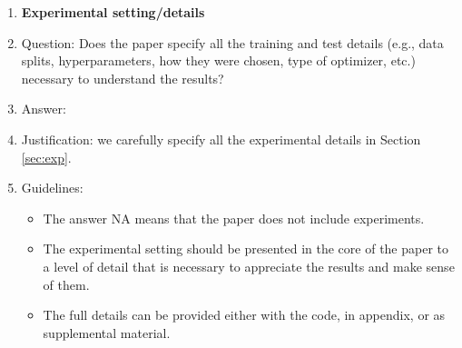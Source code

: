 \documentclass{article}
\theoremstyle{plain}
\theoremstyle{definition}
\theoremstyle{remark}
\begin{document}
\begin{enumerate}
\item {\bf Experimental setting/details}
    \item[] Question: Does the paper specify all the training and test details (e.g., data splits, hyperparameters, how they were chosen, type of optimizer, etc.) necessary to understand the results?
    \item[] Answer: \answerYes{} %
    \item[] Justification: we carefully specify all the experimental details in Section \ref{sec:exp}.
    \item[] Guidelines:
    \begin{itemize}
        \item The answer NA means that the paper does not include experiments.
        \item The experimental setting should be presented in the core of the paper to a level of detail that is necessary to appreciate the results and make sense of them.
        \item The full details can be provided either with the code, in appendix, or as supplemental material.
    \end{itemize}


\end{enumerate}
\end{document}
